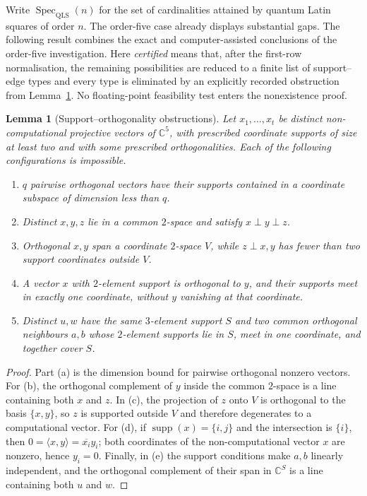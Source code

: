 \documentclass[11pt]{amsart}
\newtheorem{lemma}[theorem]{Lemma}
\theoremstyle{definition}
\newcommand{\C}{\mathbb{C}}
\newcommand{\QLS}{\mathrm{QLS}}
\begin{document}
Write $\operatorname{Spec}_{\QLS}(n)$ for the set of cardinalities attained
by quantum Latin squares of order $n$.  The order-five case already displays
substantial gaps.  The following result combines the exact and
computer-assisted conclusions of the order-five investigation.  Here
\emph{certified} means that, after the first-row normalisation, the remaining
possibilities are reduced to a finite list of support--edge types and every
type is eliminated by an explicitly recorded obstruction from
Lemma~\ref{lem:qls5-obstructions}.  No floating-point feasibility test enters
the nonexistence proof.

\begin{lemma}[Support--orthogonality obstructions]\label{lem:qls5-obstructions}
Let $x_1,\dots,x_t$ be distinct non-computational projective vectors of
$\C^5$, with prescribed coordinate supports of size at least two and with
some prescribed orthogonalities.  Each of the following configurations is
impossible.
\begin{enumerate}
\item[\textup{(a)}] $q$ pairwise orthogonal vectors have their supports
contained in a coordinate subspace of dimension less than $q$.
\item[\textup{(b)}] Distinct $x,y,z$ lie in a common $2$-space and satisfy
$x\perp y\perp z$.
\item[\textup{(c)}] Orthogonal $x,y$ span a coordinate $2$-space $V$, while
$z\perp x,y$ has fewer than two support coordinates outside $V$.
\item[\textup{(d)}] A vector $x$ with $2$-element support is orthogonal to
$y$, and their supports meet in exactly one coordinate, without $y$
vanishing at that coordinate.
\item[\textup{(e)}] Distinct $u,w$ have the same $3$-element support $S$ and
two common orthogonal neighbours $a,b$ whose $2$-element supports lie in
$S$, meet in one coordinate, and together cover $S$.
\end{enumerate}
\end{lemma}

\begin{proof}
Part (a) is the dimension bound for pairwise orthogonal nonzero vectors.
For (b), the orthogonal complement of $y$ inside the common $2$-space is a
line containing both $x$ and $z$.  In (c), the projection of $z$ onto $V$
is orthogonal to the basis $\{x,y\}$, so $z$ is supported outside $V$ and
therefore degenerates to a computational vector.  For (d), if
$\operatorname{supp}(x)=\{i,j\}$ and the intersection is $\{i\}$, then
$0=\langle x,y\rangle=\overline{x_i}y_i$; both coordinates of the
non-computational vector $x$ are nonzero, hence $y_i=0$.  Finally, in (e)
the support conditions make $a,b$ linearly independent, and the orthogonal
complement of their span in $\C^S$ is a line containing both $u$ and $w$.
\end{proof}
\end{document}
